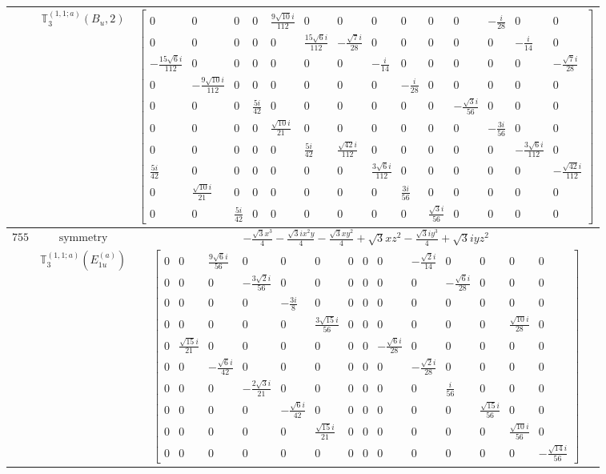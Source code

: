 \documentclass[fleqn,8pt,landscape]{jsarticle}
\begin{document}
\begin{longtable}{ccc}
$  $ & $ \mathbb{T}_{3}^{(1,1;a)}(B_{u},2) $ & $ \begin{bmatrix} 0 & 0 & 0 & 0 & \frac{9 \sqrt{10} i}{112} & 0 & 0 & 0 & 0 & 0 & 0 & - \frac{i}{28} & 0 & 0 \\ 0 & 0 & 0 & 0 & 0 & \frac{15 \sqrt{6} i}{112} & - \frac{\sqrt{7} i}{28} & 0 & 0 & 0 & 0 & 0 & - \frac{i}{14} & 0 \\ - \frac{15 \sqrt{6} i}{112} & 0 & 0 & 0 & 0 & 0 & 0 & - \frac{i}{14} & 0 & 0 & 0 & 0 & 0 & - \frac{\sqrt{7} i}{28} \\ 0 & - \frac{9 \sqrt{10} i}{112} & 0 & 0 & 0 & 0 & 0 & 0 & - \frac{i}{28} & 0 & 0 & 0 & 0 & 0 \\ 0 & 0 & 0 & \frac{5 i}{42} & 0 & 0 & 0 & 0 & 0 & 0 & - \frac{\sqrt{3} i}{56} & 0 & 0 & 0 \\ 0 & 0 & 0 & 0 & \frac{\sqrt{10} i}{21} & 0 & 0 & 0 & 0 & 0 & 0 & - \frac{3 i}{56} & 0 & 0 \\ 0 & 0 & 0 & 0 & 0 & \frac{5 i}{42} & \frac{\sqrt{42} i}{112} & 0 & 0 & 0 & 0 & 0 & - \frac{3 \sqrt{6} i}{112} & 0 \\ \frac{5 i}{42} & 0 & 0 & 0 & 0 & 0 & 0 & \frac{3 \sqrt{6} i}{112} & 0 & 0 & 0 & 0 & 0 & - \frac{\sqrt{42} i}{112} \\ 0 & \frac{\sqrt{10} i}{21} & 0 & 0 & 0 & 0 & 0 & 0 & \frac{3 i}{56} & 0 & 0 & 0 & 0 & 0 \\ 0 & 0 & \frac{5 i}{42} & 0 & 0 & 0 & 0 & 0 & 0 & \frac{\sqrt{3} i}{56} & 0 & 0 & 0 & 0 \end{bmatrix} $ \\ \hline
$ 755 $ & $ \text{symmetry} $ & $ - \frac{\sqrt{3} x^{3}}{4} - \frac{\sqrt{3} i x^{2} y}{4} - \frac{\sqrt{3} x y^{2}}{4} + \sqrt{3} x z^{2} - \frac{\sqrt{3} i y^{3}}{4} + \sqrt{3} i y z^{2} $ \\
$  $ & $ \mathbb{T}_{3}^{(1,1;a)}(E_{1u}^{(a)}) $ & $ \begin{bmatrix} 0 & 0 & \frac{9 \sqrt{6} i}{56} & 0 & 0 & 0 & 0 & 0 & 0 & - \frac{\sqrt{2} i}{14} & 0 & 0 & 0 & 0 \\ 0 & 0 & 0 & - \frac{3 \sqrt{2} i}{56} & 0 & 0 & 0 & 0 & 0 & 0 & - \frac{\sqrt{6} i}{28} & 0 & 0 & 0 \\ 0 & 0 & 0 & 0 & - \frac{3 i}{8} & 0 & 0 & 0 & 0 & 0 & 0 & 0 & 0 & 0 \\ 0 & 0 & 0 & 0 & 0 & \frac{3 \sqrt{15} i}{56} & 0 & 0 & 0 & 0 & 0 & 0 & \frac{\sqrt{10} i}{28} & 0 \\ 0 & \frac{\sqrt{15} i}{21} & 0 & 0 & 0 & 0 & 0 & 0 & - \frac{\sqrt{6} i}{28} & 0 & 0 & 0 & 0 & 0 \\ 0 & 0 & - \frac{\sqrt{6} i}{42} & 0 & 0 & 0 & 0 & 0 & 0 & - \frac{\sqrt{2} i}{28} & 0 & 0 & 0 & 0 \\ 0 & 0 & 0 & - \frac{2 \sqrt{3} i}{21} & 0 & 0 & 0 & 0 & 0 & 0 & \frac{i}{56} & 0 & 0 & 0 \\ 0 & 0 & 0 & 0 & - \frac{\sqrt{6} i}{42} & 0 & 0 & 0 & 0 & 0 & 0 & \frac{\sqrt{15} i}{56} & 0 & 0 \\ 0 & 0 & 0 & 0 & 0 & \frac{\sqrt{15} i}{21} & 0 & 0 & 0 & 0 & 0 & 0 & \frac{\sqrt{10} i}{56} & 0 \\ 0 & 0 & 0 & 0 & 0 & 0 & 0 & 0 & 0 & 0 & 0 & 0 & 0 & - \frac{\sqrt{14} i}{56} \end{bmatrix} $ \\ \hline

\end{longtable}
\end{document}
